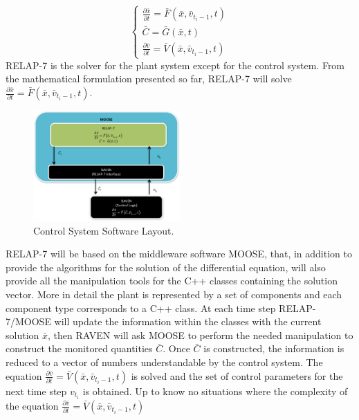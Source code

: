 \documentclass{mc2013}
\begin{document}
\begin{equation}
\begin{cases} 
\frac{\partial \bar{x}}{\partial t} = \bar{F}(\bar{x},\bar{v}_{t_{i}-1},t) \\
\bar{C} = \bar{G}(\bar{x},t) \\ 
\frac{\partial \bar{v}}{\partial t} = \bar{V}(\bar{x},\bar{v}_{t_{i}-1},t) 
\end{cases}
\label{eq:generalSystemEquationwithControlSplitting}
\end{equation}
RELAP-7 is the solver for the plant system except for the control system. From the mathematical
formulation presented so far, RELAP-7 will solve 
$\frac{\partial \bar{x}}{\partial t} = \bar{F}(\bar{x},\bar{v}_{t_{i}-1},t)$.
\begin{figure}[h] \label{fig:ControlSoftwareLayout}
  \centering
     \includegraphics[width=0.5\textwidth]{figures/ControlSystemSoftwareLayout.pdf}
  \caption{Control System Software Layout.}
\end{figure}
RELAP-7 will be based on the middleware software MOOSE, that, in addition to provide the algorithms for the solution of the differential equation, will also provide all the manipulation tools for the C++ classes containing the solution vector. More in detail the plant is represented by a set of components and each component type corresponds to a C++ class.
At each time step RELAP-7/MOOSE will update the information within the classes with the current solution  $\bar{x}$, then RAVEN will ask MOOSE to perform the needed manipulation to construct the monitored quantities $\bar{C}$. Once $\bar{C}$ is constructed, the information is reduced to a vector of
numbers understandable by the control system. The equation 
$\frac{\partial \bar{v}}{\partial t} = \bar{V}(\bar{x},\bar{v}_{t_{i}-1},t) $
is solved and the set of control parameters for the next time step $v_{t_{i}}$ is obtained. 
Up to know no situations where the complexity of the equation 
$\frac{\partial \bar{v}}{\partial t} = \bar{V}(\bar{x},\bar{v}_{t_{i}-1},t) $
\end{document}

